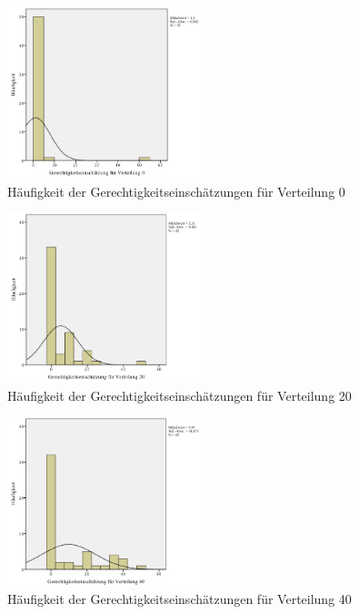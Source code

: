\documentclass[a4paper]{thesis}
\begin{document}
\begin{figure}[H]
\centering
\includegraphics[width=0.5\textwidth]{figures/verteil_0.png}
\caption[Häufigkeit der Gerechtigkeitseinschätzungen für Verteilung 0]{Häufigkeit der Gerechtigkeitseinschätzungen für Verteilung 0}
\end{figure}

\begin{figure}[H]
\centering
\includegraphics[width=0.5\textwidth]{figures/verteil_20.png}
\caption[Häufigkeit der Gerechtigkeitseinschätzungen für Verteilung 20]{Häufigkeit der Gerechtigkeitseinschätzungen für Verteilung 20}
\end{figure}

\begin{figure}[H]
\centering
\includegraphics[width=0.5\textwidth]{figures/verteil_40.png}
\caption[Häufigkeit der Gerechtigkeitseinschätzungen für Verteilung 40]{Häufigkeit der Gerechtigkeitseinschätzungen für Verteilung 40}
\end{figure}
\end{document}
